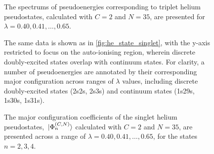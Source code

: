 \documentclass[]{article}
\begin{document}
\begin{figure}[h]
  \begin{center}
    
  \end{center}
  \caption[Triplet Helium Pseudoenergies]{
    The spectrums of pseudoenergies corresponding to triplet helium
    pseudostates, calculated with $C = 2$ and $N = 35$, are presented for
    $\lambda = 0.40, 0.41, \dotsc, 0.65$.
  }
  \label{fig:he_state_triplet}
\end{figure}

\begin{figure}[h]
  \begin{center}
    
  \end{center}
  \caption[Singlet Helium Pseudoenergies - Auto-Ionising Region]{
    The same data is shown as in \autoref{fig:he_state_singlet}, with the y-axis
    restricted to focus on the auto-ionising region, wherein discrete
    doubly-excited states overlap with continuum states.
    For clarity, a number of pseudoenergies are annotated by their corresponding
    major configuration across ranges of $\lambda$ values, including discrete
    doubly-excited states (2s2s, 2s3s) and continuum states (1s29s, 1s30s,
    1s31s).
  }
  \label{fig:he_state_singlet_auto_ionising}
\end{figure}

\clearpage



\begin{figure}[h]
  \begin{center}
    
  \end{center}
  \caption[Major Configuration Coefficients: Singly-Excited]{
    The major configuration coefficients of the singlet helium pseudostates,
    $\ket*{\Phi_{n}^{(C, N)}}$ calculated with $C = 2$ and $N = 35$, are
    presented across a range of $\lambda = 0.40, 0.41, \dotsc, 0.65$, for the
    states $n = 2, 3, 4$.
  }
  \label{fig:mcc_3}
\end{figure}
\end{document}
